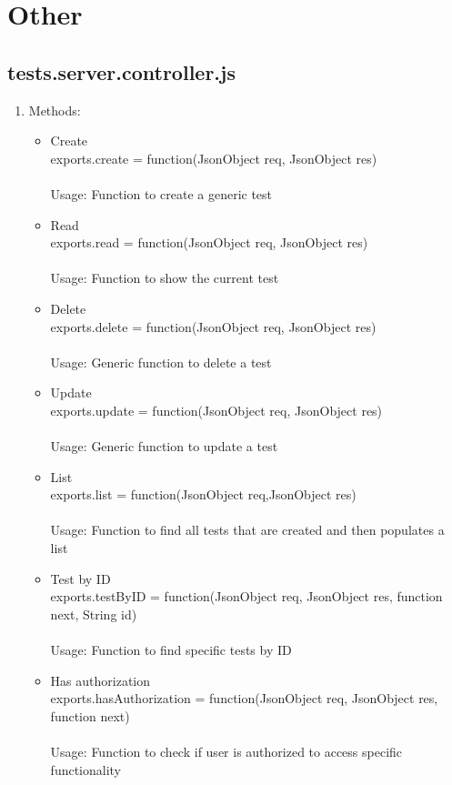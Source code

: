 \documentclass[a4paper,12pt]{article}
\begin{document}
\section{Other}
\subsection{tests.server.controller.js}
\begin{enumerate}
	\item Methods:
	\begin{itemize}
		\item Create \\ exports.create = function(JsonObject req, JsonObject res) 
		\\ \\ Usage: Function to create a generic test
		\item Read \\ exports.read = function(JsonObject req, JsonObject res) 
		\\ \\ Usage: Function to show the current test
		\item Delete \\ exports.delete = function(JsonObject req, JsonObject res) 
		\\ \\ Usage: Generic function to delete a test
		\item Update \\ exports.update = function(JsonObject req, JsonObject res) 
		\\ \\ Usage: Generic function to update a test 
		\item List \\ exports.list = function(JsonObject req,JsonObject res)
		\\ \\ Usage: Function to find all tests that are created and then populates a list
		\item Test by ID \\ exports.testByID = function(JsonObject req, JsonObject res, function next, String id)
		\\ \\ Usage: Function to find specific tests by ID
		\item Has authorization \\ exports.hasAuthorization = function(JsonObject req, JsonObject res, function next)
		\\ \\ Usage: Function to check if user is authorized to access specific functionality
	\end{itemize}
\end{enumerate}
\end{document}
